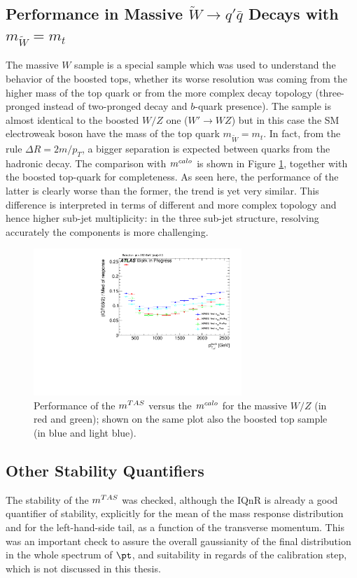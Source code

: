 \subsection{Performance in Massive $\tilde{W}\to q'\bar{q}$ Decays with $m_{\tilde{W}}=m_t$}
The massive $W$ sample is a special sample which was used to understand the behavior of the boosted tops, whether its worse resolution was coming from the higher mass of the top quark or from the more complex decay topology (three-pronged instead of two-pronged decay and $b$-quark presence). 
The sample is almost identical to the boosted $W/Z$ one ($W'\to WZ$) but in this case the SM electroweak boson have the mass of the top quark $m_{\tilde{W}}=m_t$.
In fact, from the rule $\Delta R=2m/p_T$, a bigger separation is expected between quarks from the hadronic decay.
The comparison with $m^{calo}$ is shown in Figure \ref{fig:mtas6}, together with the boosted top-quark for completeness. As seen here, the performance of the latter is clearly worse than the former, the trend is yet very similar. This difference is interpreted in terms of different and more complex topology and hence higher sub-jet multiplicity: in the three sub-jet structure, resolving accurately the components is more challenging.

\begin{figure}[!ht]
  \centering
     \includegraphics[width=0.7\textwidth]{jet_part/mtas/71graphcftr_h_JetRatio_mJ12CALOIQRoMcalib_WmassiveVsTops.pdf}
   \caption[$\mtas$ for boosted massive $W/Z$]{Performance of the $\mtas$ versus the $m^{calo}$ for the massive $W/Z$ (in red and green); shown on the same plot also the boosted top sample (in blue and light blue).}
  \label{fig:mtas6}
\end{figure}

\subsection{Other Stability Quantifiers}
The stability of the $\mtas$ was checked, although the IQnR is already a good quantifier of stability, explicitly for the mean of the mass response distribution and for the left-hand-side tail, as a function of the transverse momentum. This was an important check to assure the overall gaussianity of the final distribution in the whole spectrum of $\pt$, and suitability in regards of the calibration step, which is not discussed in this thesis.


